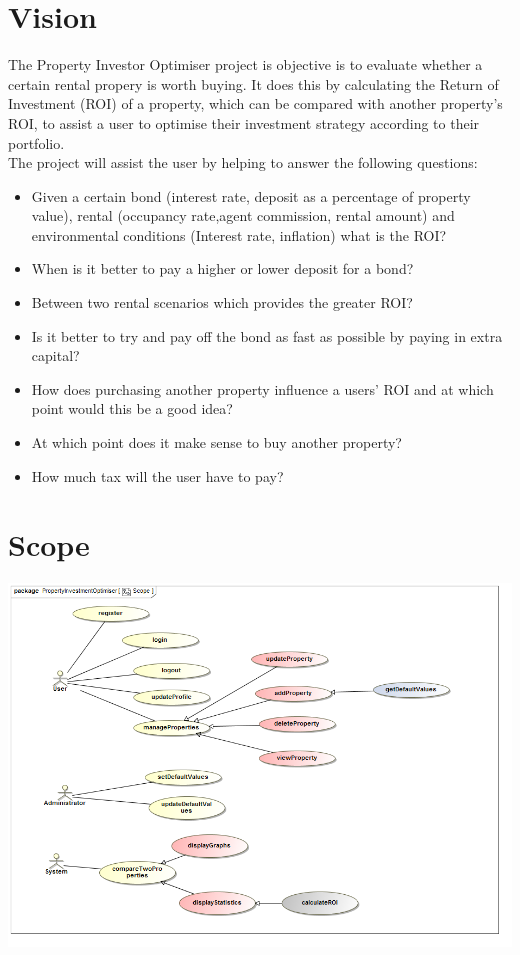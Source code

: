 \documentclass[a4paper,12pt]{article}
\begin{document}
\section{Vision}
The Property Investor Optimiser project is objective is to evaluate whether a certain rental propery is worth buying. It does this by calculating the Return of Investment (ROI) of a property, which can be compared with another property's ROI, to assist a user to optimise their investment strategy according to their portfolio.\\[0.2cm]
The project will assist the user by helping to answer the following questions:
\begin{itemize}
	\item Given a certain bond (interest rate, deposit as a percentage of property value), rental (occupancy rate,agent commission, rental amount) and environmental conditions (Interest rate, inflation) what is the ROI?
	\item When is it better to pay a higher or lower deposit for a bond?
	\item Between two rental scenarios which provides the greater ROI?
	\item Is it better to try and pay off the bond as fast as possible by paying in extra capital?
	\item How does purchasing another property influence a users’ ROI and at which point would this be a good idea?
	\item At which point does it make sense to buy another property?
	\item How much tax will the user have to pay?
\end{itemize}
\newpage
\section{Scope}
\includegraphics[width=1\textwidth]{./Image/Scope.png}
\newpage
\end{document}
